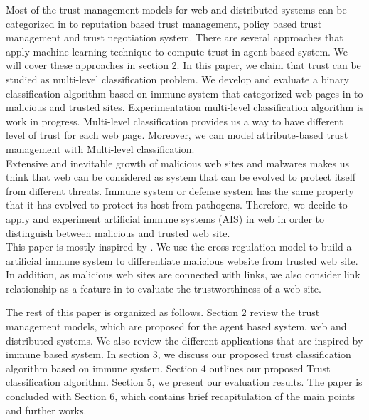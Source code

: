 \documentclass{llncs}
\begin{document}
Most of the trust management models for web and distributed systems can be categorized in to reputation based trust management, policy based trust management and trust negotiation system.  There are several approaches that apply machine-learning technique to compute trust in agent-based system.  We will cover these approaches in section 2. In this paper, we claim that trust can be studied as multi-level classification problem.  We develop and evaluate a binary classification algorithm based on immune system that categorized web pages in to malicious and trusted sites.  Experimentation multi-level classification algorithm is work in progress. Multi-level classification provides us a way to have different level of trust for each web page. Moreover, we can model attribute-based trust management \cite{mitchell} with Multi-level classification. \\

Extensive and inevitable growth of malicious web sites and malwares makes us think that web can be considered as system that can be evolved to protect itself from different threats.  Immune system or defense system has the same property that it has evolved to protect its host from pathogens. 
Therefore, we decide to apply and experiment artificial immune systems (AIS) \cite{AIS} in web in order to distinguish between malicious and trusted web site.\\ 


This paper is mostly inspired by \cite{Al1}. We use the cross-regulation model\cite{carneiro} to build a artificial immune system to differentiate malicious website from trusted web site. In addition, as malicious web sites are connected with links, we also consider link relationship as a feature in to evaluate the trustworthiness of a web site. 


The rest of this paper is organized as follows. Section 2 review the trust management models, which are proposed for the agent based system, web and distributed systems.  We also review the different applications that are inspired by immune based system. In section 3, we discuss our proposed trust classification algorithm based on immune system.  Section 4 outlines our proposed Trust classification algorithm. Section 5, we present our evaluation results. The paper is concluded with Section 6, which contains brief recapitulation of the main points and further works.
\end{document}
